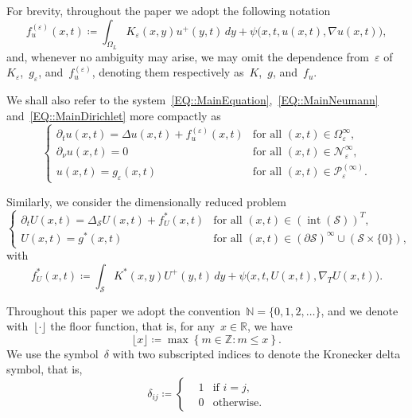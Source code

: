 \documentclass[12pt,a4paper]{amsart}
\numberwithin{equation}{section}
\theoremstyle{definition}
\theoremstyle{remark}
\newcommand{\R}{\mathbb{R}}
\newcommand{\N}{\mathbb{N}}
\newcommand{\eps}{\varepsilon}
\renewcommand{\leq}{\leqslant}
\begin{document}
For brevity, throughout the paper we adopt the following notation
\begin{equation}\label{EQ::ForcingTerm}
    f_u^{(\eps)}(x,t) \coloneq \int_{\Omega_L} K_\eps(x,y) u^+(y, t)\, dy + \psi\big(x,t,u(x,t),\nabla u(x,t)\big),
\end{equation}
and, whenever no ambiguity may arise, we may omit the dependence from~$\eps$ of~$K_\eps$,~$g_\eps$, and~$f_u^{(\eps)}$, denoting them respectively as~$K$,~$g$, and~$f_u$.

We shall also refer to the system~\eqref{EQ::MainEquation},~\eqref{EQ::MainNeumann} and~\eqref{EQ::MainDirichlet} more compactly as
\begin{equation}\label{EQ::MainProblemEpsilon}
    \begin{cases}
        \partial_{t} u(x,t) = \Delta u(x,t) + f_u^{(\eps)}(x,t)&\text{for all }(x,t) \in \Omega_\eps^\infty,\\
        \partial_{\nu} u(x,t) = 0&\text{for all }(x,t) \in \mathcal{N}_\eps^\infty,\\
        u(x,t) = g_\eps(x,t)&\text{for all }(x,t) \in \mathcal{P}_\eps^{(\infty)}.
    \end{cases}
\end{equation}

Similarly, we consider the dimensionally reduced problem
\begin{equation}\label{EQ::MainProblemS}
    \begin{cases}
        \partial_{t} U(x,t) = \Delta_\mathcal{S} U(x,t) + f_{U}^{\ast}(x,t)&\text{for all }(x,t) \in {\left(\operatorname{int}(\mathcal{S})\right)}^T,\\
        U(x,t) = g^\ast(x,t)&\text{for all }(x,t) \in {(\partial\mathcal{S})}^\infty \cup \left(\mathcal{S} \times \{0\}\right),
    \end{cases}
\end{equation}
with
\[f_U^{\ast}(x,t) \coloneq \int_{\mathcal{S}} K^\ast(x,y)U^+(y,t)\,dy + \psi\big(x,t,U(x,t),\nabla_T U(x,t)\big).\]

Throughout this paper we adopt the convention~$\N = \{0,1,2,\dots\}$, and we denote with~$\lfloor \cdot \rfloor$ the floor function, that is, for any~$x \in \R$, we have
\[\lfloor x \rfloor \coloneq \max\left\{m \in \mathbb{Z} \colon m \leq x\right\}.\]
We use the symbol~$\delta$ with two subscripted indices to denote the Kronecker delta symbol, that is,
\begin{equation}
    \delta_{ij} \coloneq \left\{\begin{aligned}
        &1&\text{if }i=j,\\
        &0&\text{otherwise.} 
    \end{aligned}\right.
\end{equation}
\end{document}
